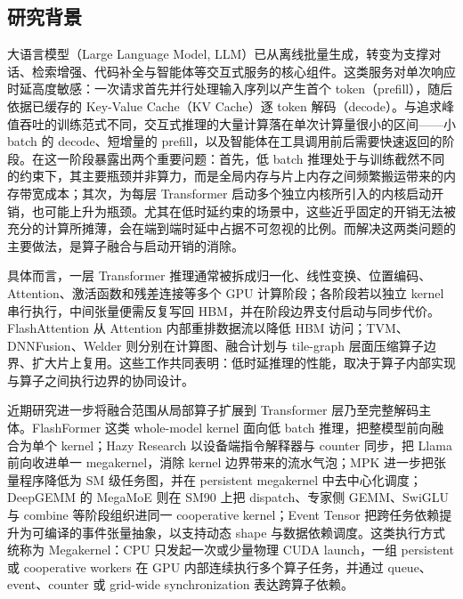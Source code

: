 \subsection{研究背景}
大语言模型（Large Language Model, LLM）已从离线批量生成，转变为支撑对话、检索增强、代码补全与智能体等交互式服务的核心组件\cite{yu2022orca,kwon2023vllm}。这类服务对单次响应时延高度敏感：一次请求首先并行处理输入序列以产生首个 token（prefill），随后依据已缓存的 Key-Value Cache（KV Cache）逐 token 解码（decode）\cite{zhong2024distserve,agrawal2024sarathiServe}。与追求峰值吞吐的训练范式不同，交互式推理的大量计算落在单次计算量很小的区间——小 batch 的 decode、短增量的 prefill，以及智能体在工具调用前后需要快速返回的阶段\cite{luo2026agentix}。在这一阶段暴露出两个重要问题：首先，低 batch 推理处于与训练截然不同的约束下，其主要瓶颈并非算力，而是全局内存与片上内存之间频繁搬运带来的内存带宽成本\cite{dao2022flashattention,nrusimha2025flashformer}；其次，为每层 Transformer 启动多个独立内核所引入的内核启动开销，也可能上升为瓶颈\cite{nrusimha2025flashformer,vellaisamy2026taxbreak}。尤其在低时延约束的场景中，这些近乎固定的开销无法被充分的计算所摊薄，会在端到端时延中占据不可忽视的比例。而解决这两类问题的主要做法，是算子融合与启动开销的消除\cite{chen2018tvm,niu2021dnnfusion,shi2023welder,nvidia2026cudaGraphs}。

具体而言，一层 Transformer 推理通常被拆成归一化、线性变换、位置编码、Attention、激活函数和残差连接等多个 GPU 计算阶段；各阶段若以独立 kernel 串行执行，中间张量便需反复写回 HBM，并在阶段边界支付启动与同步代价。FlashAttention 从 Attention 内部重排数据流以降低 HBM 访问；TVM、DNNFusion、Welder 则分别在计算图、融合计划与 tile-graph 层面压缩算子边界、扩大片上复用。这些工作共同表明：低时延推理的性能，取决于算子内部实现与算子之间执行边界的协同设计\cite{dao2022flashattention,chen2018tvm,niu2021dnnfusion,shi2023welder}。

近期研究进一步将融合范围从局部算子扩展到 Transformer 层乃至完整解码主体。FlashFormer 这类 whole-model kernel 面向低 batch 推理，把整模型前向融合为单个 kernel\cite{nrusimha2025flashformer}；Hazy Research 以设备端指令解释器与 counter 同步，把 Llama 前向收进单一 megakernel，消除 kernel 边界带来的流水气泡\cite{hazy2025nobubbles,hazyMegakernels2025}；MPK 进一步把张量程序降低为 SM 级任务图，并在 persistent megakernel 中去中心化调度\cite{cheng2025mpk}；DeepGEMM 的 MegaMoE 则在 SM90 上把 dispatch、专家侧 GEMM、SwiGLU 与 combine 等阶段组织进同一 cooperative kernel\cite{deepgemm2026,deepgemmPr360}；Event Tensor 把跨任务依赖提升为可编译的事件张量抽象，以支持动态 shape 与数据依赖调度\cite{eventTensor2026}。这类执行方式统称为 Megakernel：CPU 只发起一次或少量物理 CUDA launch，一组 persistent 或 cooperative workers 在 GPU 内部连续执行多个算子任务，并通过 queue、event、counter 或 grid-wide synchronization 表达跨算子依赖。

